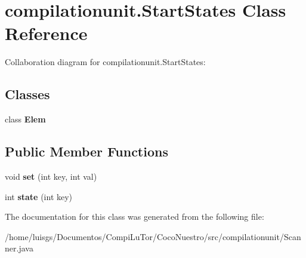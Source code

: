 \hypertarget{classcompilationunit_1_1_start_states}{
\section{compilationunit.StartStates Class Reference}
\label{classcompilationunit_1_1_start_states}
}


Collaboration diagram for compilationunit.StartStates:
\subsection*{Classes}
\begin{DoxyCompactItemize}
\item 
class {\bfseries Elem}
\end{DoxyCompactItemize}
\subsection*{Public Member Functions}
\begin{DoxyCompactItemize}
\item 
\hypertarget{classcompilationunit_1_1_start_states_a0945c5c665355dbc9889bde932afd631}{
void {\bfseries set} (int key, int val)}
\label{classcompilationunit_1_1_start_states_a0945c5c665355dbc9889bde932afd631}

\item 
\hypertarget{classcompilationunit_1_1_start_states_a2eac9d9300a1309dd48c20483bf54e33}{
int {\bfseries state} (int key)}
\label{classcompilationunit_1_1_start_states_a2eac9d9300a1309dd48c20483bf54e33}

\end{DoxyCompactItemize}


The documentation for this class was generated from the following file:\begin{DoxyCompactItemize}
\item 
/home/luisgs/Documentos/CompiLuTor/CocoNuestro/src/compilationunit/Scanner.java\end{DoxyCompactItemize}
